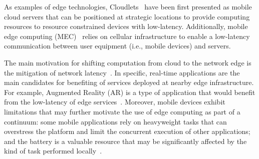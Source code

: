 As examples of edge technologies, Cloudlets~\cite{Satyanarayanan:2009} have been first presented as mobile cloud servers that can be positioned at strategic locations to provide computing resources to resource constrained devices with low-latency. 
Additionally, mobile edge computing (MEC)~\cite{ahmed2016isco} relies on cellular infrastructure to enable a low-latency communication between user equipment (i.e., mobile devices) and servers. 

The main motivation for shifting computation from cloud to the network edge is the mitigation of network latency~\cite{Bonomi2014}. In specific, real-time applications are the main candidates for benefiting of services deployed at nearby edge infrastructure. For example, Augmented Reality (AR) is a type of application that would benefit from the low-latency of edge services~\cite{hu2015mobile,GarrigaMendonca2017}. Moreover, mobile devices exhibit limitations that may further motivate the use of edge computing as part of a continuum: some mobile applications rely on heavyweight tasks that can overstress the platform and limit the concurrent execution of other applications; and the battery is a valuable resource that may be significantly affected by the kind of task performed locally~\cite{Carroll:2010}. 

